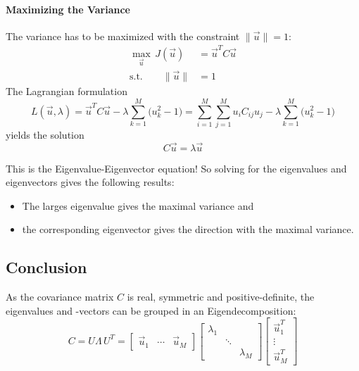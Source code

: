 			\paragraph{Maximizing the Variance}
				The variance has to be maximized with the constraint \( \lVert \vec{u} \rVert = 1 \):
				\begin{align}
					\max_{\vec{u}} \, J(\vec{u}) & = \vec{u}^T C \vec{u} \\
					\textrm{s.t.} \qquad
					\lVert \vec{u} \rVert        & = 1
				\end{align}
				The Lagrangian formulation
				\begin{equation}
					L(\vec{u}, \lambda) = \vec{u}^T C \vec{u} - \lambda \sum_{k = 1}^{M} \big(u_k^2 - 1\big) = \sum_{i = 1}^{M} \sum_{j = 1}^{M} u_i C_{ij} u_j - \lambda \sum_{k = 1}^{M} \big(u_k^2 - 1\big)
				\end{equation}
				yields the solution
				\begin{equation}
					C\vec{u} = \lambda\vec{u}
				\end{equation}

				This is the Eigenvalue-Eigenvector equation! So solving for the eigenvalues and eigenvectors gives the following results:
				\begin{itemize}
					\item The larges eigenvalue gives the maximal variance and
					\item the corresponding eigenvector gives the direction with the maximal variance.
				\end{itemize}

		\subsection{Conclusion}
			As the covariance matrix \(C\) is real, symmetric and positive-definite, the eigenvalues and -vectors can be grouped in an Eigendecomposition:
			\begin{equation}
				C = U \Lambda \, U^T =
				\begin{bmatrix} \vec{u}_1 & \cdots & \vec{u}_M \end{bmatrix}
				\begin{bmatrix}
					\lambda_1 &        &           \\
					          & \ddots &           \\
					          &        & \lambda_M
				\end{bmatrix}
				\begin{bmatrix} \vec{u}_1^T \\ \vdots \\ \vec{u}_M^T \end{bmatrix}
			\end{equation}

